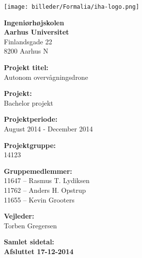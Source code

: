 
{}

\begin{minipage}[t]{0.48\textwidth}
\vspace*{14pt}			%
\texttt{[image: billeder/Formalia/iha-logo.png]} 
\end{minipage}
\hfill

\vspace*{1cm}

\begin{minipage}[t]{0.48\textwidth}

{\small 
\flushleft
\textbf{Ingeniørhøjskolen}\\
\textbf{Aarhus Universitet}  \\
Finlandsgade 22 \\
8200 Aarhus N \\
}

\vspace*{1cm}

\textbf{Projekt titel:} \\[5pt]\bigskip\hspace{2ex}
Autonom overvågningsdrone

\textbf{Projekt:} \\[5pt]\bigskip\hspace{2ex}
Bachelor projekt

\textbf{Projektperiode:} \\[5pt]\bigskip\hspace{2ex}
August 2014 - December 2014

\textbf{Projektgruppe:} \\[5pt]\bigskip\hspace{2ex}
14123

\textbf{Gruppemedlemmer:} \\[5pt]\hspace*{2ex}
11647 -- Rasmus T. Lydiksen \\\hspace*{2ex}
11762 -- Anders H. Opstrup \\\bigskip\hspace*{2ex}
11655 -- Kevin Grooters \\\bigskip\hspace*{2ex}


\textbf{Vejleder:} \\[5pt]\hspace*{2ex}
Torben Gregersen \\\bigskip\hspace{2ex}

\vspace*{1cm}

\textbf{Samlet sidetal: \pageref{LastPage}} \\
\textbf{Afsluttet 17-12-2014}


\end{minipage}
\hfill
\vfill

